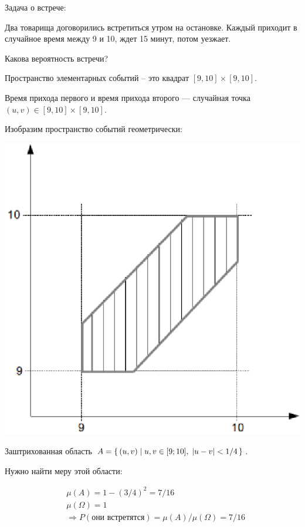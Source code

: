 \begin{example}
	Задача о встрече:
	
	Два товарища договорились встретиться утром на остановке. Каждый приходит в случайное время между 9 и 10, ждет 15 минут, потом уезжает.

	Какова вероятность встречи?\\

	\begin{solution}
		Пространство элементарных событий -- это квадрат $[9, 10] \times [9, 10]$.

		Время прихода первого и время прихода второго --- случайная точка $(u, v) \in [9, 10] \times [9, 	10]$.

		Изобразим пространство событий геометрически:

		\includegraphics{pictures/13_09_graph.eps}

		Заштрихованная область $A = \left\{ \, (u, v) \mid u, v \in [9; 10],\; |u - v| < 1/4  \, \right\}$.

		Нужно найти меру этой области:

		\begin{align*}
			&\mu(A) = 1 - (3/4)^2 = 7/16\\
			&\mu(\Omega) = 1\\
			&\Rightarrow P(\text{они встретятся}) = \mu(A) / \mu(\Omega) = 7/16\\
		\end{align*}

	\end{solution}
\end{example}

